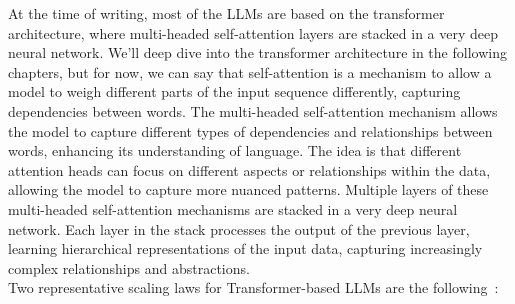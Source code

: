 At the time of writing, most of the LLMs are based on the transformer architecture, where multi-headed self-attention layers are stacked in a very deep neural network.
We'll deep dive into the transformer architecture in the following chapters, but for now, we can say that self-attention is a mechanism to allow a model to weigh different parts of the input sequence differently, capturing dependencies between words.
The multi-headed self-attention mechanism allows the model to capture different types of dependencies and relationships between words, enhancing its understanding of language.
The idea is that different attention heads can focus on different aspects or relationships within the data, allowing the model to capture more nuanced patterns.
Multiple layers of these multi-headed self-attention mechanisms are stacked in a very deep neural network.
Each layer in the stack processes the output of the previous layer, learning hierarchical representations of the input data, capturing increasingly complex relationships and abstractions. \\
Two representative scaling laws for Transformer-based LLMs are the following~\cite{scaling1, scaling2}:
